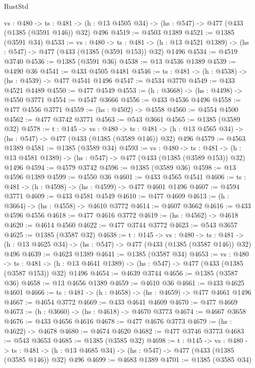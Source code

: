 \begin{lexlean}{RustStd}
\begin{coremodule}
  {vs : @480} ->
  {ts : @481} -> (h : @13 @4505 @34) -> (hs : @547) -> @477 (@433 (@1385 (@3591 @146)) @32) @496
@4519 := @4503 @1389
@4521 := @1385 (@3591 @34)
@4533 := {vs : @480} ->
  {ts : @481} -> (h : @13 @4521 @1389) -> (hs : @547) -> @477 (@433 (@1385 (@3591 @153)) @32) @1496
@4534 := @4519 @3740
@4536 := @1385 (@3591 @36)
@4538 := @13 @4536 @1389
@4539 := @4490 @36
@4541 := @433 @4505 @4481
@4546 := {ts : @481} -> (h : @4538) -> (hs : @4539) -> @477 @4541 @1496
@4547 := @4534 @3770
@4549 := @433 @4521 @4489
@4550 := @477 @4549
@4553 := (h : @3668) -> (hs : @4498) -> @4550 @3771
@4554 := @4547 @3666
@4556 := @433 @4536 @4496
@4558 := @477 @4556 @3771
@4559 := (hs : @4502) -> @4558
@4560 := @4554 @4500
@4562 := @477 @3742 @3771
@4563 := @543 @3661
@4565 := @1385 (@3589 @32)
@4578 := {t : @145} ->
  {vs : @480} ->
  {ts : @481} -> (h : @13 @4565 @34) -> (hs : @547) -> @477 (@433 (@1385 (@3589 @146)) @32) @496
@4579 := @4563 @1389
@4581 := @1385 (@3589 @34)
@4593 := {vs : @480} ->
  {ts : @481} -> (h : @13 @4581 @1389) -> (hs : @547) -> @477 (@433 (@1385 (@3589 @153)) @32) @1496
@4594 := @4579 @3742
@4596 := @1385 (@3589 @36)
@4598 := @13 @4596 @1389
@4599 := @4550 @36
@4601 := @433 @4565 @4541
@4606 := {ts : @481} -> (h : @4598) -> (hs : @4599) -> @477 @4601 @1496
@4607 := @4594 @3771
@4609 := @433 @4581 @4549
@4610 := @477 @4609
@4613 := (h : @3664) -> (hs : @4558) -> @4610 @3772
@4614 := @4607 @3662
@4616 := @433 @4596 @4556
@4618 := @477 @4616 @3772
@4619 := (hs : @4562) -> @4618
@4620 := @4614 @4560
@4622 := @477 @3744 @3772
@4623 := @543 @3657
@4625 := @1385 (@3587 @32)
@4638 := {t : @145} ->
  {vs : @480} ->
  {ts : @481} -> (h : @13 @4625 @34) -> (hs : @547) -> @477 (@433 (@1385 (@3587 @146)) @32) @496
@4639 := @4623 @1389
@4641 := @1385 (@3587 @34)
@4653 := {vs : @480} ->
  {ts : @481} -> (h : @13 @4641 @1389) -> (hs : @547) -> @477 (@433 (@1385 (@3587 @153)) @32) @1496
@4654 := @4639 @3744
@4656 := @1385 (@3587 @36)
@4658 := @13 @4656 @1389
@4659 := @4610 @36
@4661 := @433 @4625 @4601
@4666 := {ts : @481} -> (h : @4658) -> (hs : @4659) -> @477 @4661 @1496
@4667 := @4654 @3772
@4669 := @433 @4641 @4609
@4670 := @477 @4669
@4673 := (h : @3660) -> (hs : @4618) -> @4670 @3773
@4674 := @4667 @3658
@4676 := @433 @4656 @4616
@4678 := @477 @4676 @3773
@4679 := (hs : @4622) -> @4678
@4680 := @4674 @4620
@4682 := @477 @3746 @3773
@4683 := @543 @3653
@4685 := @1385 (@3585 @32)
@4698 := {t : @145} ->
  {vs : @480} ->
  {ts : @481} -> (h : @13 @4685 @34) -> (hs : @547) -> @477 (@433 (@1385 (@3585 @146)) @32) @496
@4699 := @4683 @1389
@4701 := @1385 (@3585 @34)

\end{coremodule}
\end{lexlean}
